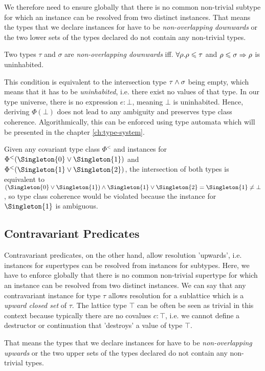 We therefore need to ensure globally that there is no common non-trivial subtype for which an instance can be resolved from two distinct instances.
That means the types that we declare instances for have to be \emph{non-overlapping downwards} or the two lower sets of the types declared do not contain any non-trivial types.

\begin{definition}
  Two types $\tau$ and $\sigma$ are \emph{non-overlapping downwards} iff. $\forall\rho. \rho \leqslant \tau$ and $\rho \leqslant \sigma \Rightarrow \rho$ is uninhabited.
\end{definition}

This condition is equivalent to the intersection type $\tau \wedge \sigma$ being empty, which means that it has to be \emph{uninhabited}, i.e. there exist no values of that type.
In our type universe, there is no expression $e : \bot$, meaning $\bot$ is uninhabited.
Hence, deriving $\Phi(\bot)$ does not lead to any ambiguity and preserves type class coherence.
Algorithmically, this can be enforced using type automata which will be presented in the chapter \ref{ch:type-system}.

Given any covariant type class $\Phi^<$ and instances for $\Phi^<(\Singleton{0} \join \Singleton{1})$ and $\Phi^<(\Singleton{1} \join \Singleton{2})$,
the intersection of both types is equivalent to $(\Singleton{0} \join \Singleton{1}) \meet \Singleton{1} \join \Singleton{2} = \Singleton{1} \neq \bot$, so type class coherence would be violated because the instance for $\Singleton{1}$ is ambiguous.

\subsection{Contravariant Predicates}

Contravariant predicates, on the other hand, allow resolution 'upwards', i.e. instances for supertypes can be resolved from instances for subtypes.
Here, we have to enforce globally that there is no common non-trivial supertype for which an instance can be resolved from two distinct instances.
We can say that any contravariant instance for type $\tau$ allows resolution for a sublattice which is a \emph{upward closed set} of $\tau$.
The lattice type $\top$ can be often be seen as trivial in this context because typically there are no covalues $c : \top$, i.e. we cannot define a destructor or continuation that 'destroys' a value of type $\top$.

That means the types that we declare instances for have to be \emph{non-overlapping upwards} or the two upper sets of the types declared do not contain any non-trivial types.

